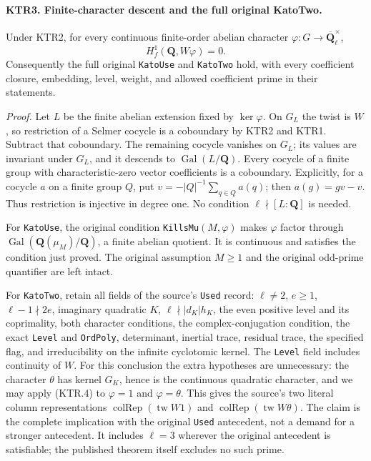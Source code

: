 \documentclass[11pt,a4paper]{article}
\numberwithin{equation}{section}
\theoremstyle{remark}\newtheorem{remark}[theorem]{Remark}
\begin{document}
\paragraph{KTR3. Finite-character descent and the full original KatoTwo.}
\label{claim:KTR3}
Under KTR2, for every continuous finite-order abelian character
\(\varphi:G\to\overline{\mathbf Q}_\ell^\times\),
\[
                       H^1_f(\mathbf Q,W\varphi)=0.
 \tag{KTR.4}
\]
Consequently the full original \texttt{Kato\allowbreak Use} and
\texttt{Kato\allowbreak Two} hold, with every coefficient closure, embedding,
level, weight, and allowed coefficient prime in their statements.

\emph{Proof.}
Let \(L\) be the finite abelian extension fixed by
\(\ker\varphi\).  On \(G_L\) the twist is \(W\), so
restriction of a Selmer cocycle is a coboundary by KTR2 and
KTR1.  Subtract that coboundary.  The remaining cocycle vanishes
on \(G_L\); its values are invariant under \(G_L\), and it
descends to \(\operatorname{Gal}(L/\mathbf Q)\).
Every cocycle of a finite group with characteristic-zero vector
coefficients is a coboundary.  Explicitly, for a cocycle \(a\)
on a finite group \(Q\), put
\(v=-|Q|^{-1}\sum_{q\in Q}a(q)\); then
\(a(g)=g v-v\).  Thus restriction is injective in degree one.
No condition \(\ell\nmid[L:\mathbf Q]\) is needed.

For \texttt{Kato\allowbreak Use}, the original condition
\texttt{Kills\allowbreak Mu}\((M,\varphi)\) makes \(\varphi\) factor
through \(\operatorname{Gal}(\mathbf Q(\mu_M)/\mathbf Q)\),
a finite abelian quotient.  It is continuous and satisfies the
condition just proved.  The original assumption \(M\ge1\)
and the original odd-prime quantifier are left intact.

For \texttt{Kato\allowbreak Two}, retain all fields of the source's
\texttt{Used} record: \(\ell\ne2\), \(e\ge1\),
\(\ell-1\nmid2e\), imaginary quadratic \(K\),
\(\ell\nmid|d_K|h_K\), the even positive level and its
coprimality, both character conditions, the complex-conjugation
condition, the exact \texttt{Level} and \texttt{Ord\allowbreak Poly},
determinant, inertial trace, residual trace, the specified flag,
and irreducibility on the infinite cyclotomic kernel.
The \texttt{Level} field includes continuity of \(W\).
For this conclusion the extra hypotheses are unnecessary:
the character \(\theta\) has kernel \(G_K\), hence is the
continuous quadratic character, and we may apply (KTR.4) to
\(\varphi=1\) and \(\varphi=\theta\).
This gives the source's two literal column representations
\(\operatorname{colRep}(\operatorname{tw}W1)\) and
\(\operatorname{colRep}(\operatorname{tw}W\theta)\).
The claim is the complete implication with the original
\texttt{Used} antecedent, not a demand for a stronger antecedent.
It includes \(\ell=3\) wherever the original antecedent is
satisfiable; the published theorem itself excludes no such prime.
\end{document}
